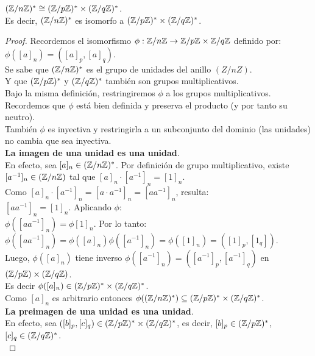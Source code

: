 \begin{enunciado} \label{enun:isounidades}\leavevmode\par 
$(\mathbb{Z}/n\mathbb{Z})^{*} \cong (\mathbb{Z}/p\mathbb{Z})^{*} \times (\mathbb{Z}/q\mathbb{Z})^{*}$. \\
Es decir, $(\mathbb{Z}/n\mathbb{Z})^{*}$ es isomorfo a $(\mathbb{Z}/p\mathbb{Z})^{*} \times (\mathbb{Z}/q\mathbb{Z})^{*}$.
\end{enunciado}

\begin{proof}
Recordemos el isomorfismo $\phi: \mathbb{Z}/n\mathbb{Z} \to \mathbb{Z}/p\mathbb{Z} \times \mathbb{Z}/q\mathbb{Z}$ definido por: \\
$\phi ([a]_n) = ([a]_p, [a]_q)$. \\
Se sabe que $(\mathbb{Z}/n\mathbb{Z})^{*}$ es el grupo de unidades del anillo $(Z/nZ)$. \\
Y que $(\mathbb{Z}/p\mathbb{Z})^{*}$ y $(\mathbb{Z}/q\mathbb{Z})^{*}$ también son grupos multiplicativos. \\
Bajo la misma definición, restringiremos $\phi$ a los grupos multiplicativos. \\
Recordemos que $\phi$ está bien definida y preserva el producto (y por tanto su neutro).  \\
También $\phi$ es inyectiva y restringirla a un subconjunto del dominio (las unidades) no cambia que sea inyectiva. \\
\textbf{La imagen de una unidad es una unidad}. \\
En efecto, sea $[a]_n \in (\mathbb{Z}/n\mathbb{Z})^{*}$. Por definición de grupo multiplicativo, existe $[a^{-1}]_n \in (\mathbb{Z}/n\mathbb{Z})$ tal que $[a]_n \cdot [a^{-1}]_n = [1]_n$. \\
Como $[a]_n \cdot [a^{-1}]_n =[a \cdot a^{-1}]_n = [aa^{-1}]_n$, resulta: \\
$[aa^{-1}]_n=[1]_n$. Aplicando $\phi$: \\
$\phi([aa^{-1}]_n)=\phi[1]_n$. Por lo tanto: \\
$\phi([aa^{-1}]_n) = \phi([a]_n)\phi([a^{-1}]_n) = \phi([1]_n) = ([1]_p,[1_q])$. \\
Luego, $\phi([a]_n)$ tiene inverso $\phi([a^{-1}]_n) = ([a^{-1}]_p,[a^{-1}]_q)$ en  $(\mathbb{Z}/p\mathbb{Z}) \times (\mathbb{Z}/q\mathbb{Z})$. \\
Es decir $\phi([a]_n) \in (\mathbb{Z}/p\mathbb{Z})^{*} \times (\mathbb{Z}/q\mathbb{Z})^{*}$.\\
Como $[a]_n$ es arbitrario entonces $\phi((\mathbb{Z}/n\mathbb{Z})^{*})\subseteq (\mathbb{Z}/p\mathbb{Z})^{*} \times (\mathbb{Z}/q\mathbb{Z})^{*}$. \\
\textbf{La preimagen de una unidad es una unidad}. \\
En efecto, sea $([b]_p,[c]_q)\in (\mathbb{Z}/p\mathbb{Z})^{*} \times (\mathbb{Z}/q\mathbb{Z})^{*}$, es decir, $[b]_p \in (\mathbb{Z}/p\mathbb{Z})^{*}$, $[c]_q \in (\mathbb{Z}/q\mathbb{Z})^{*}$. \\

\end{proof}

